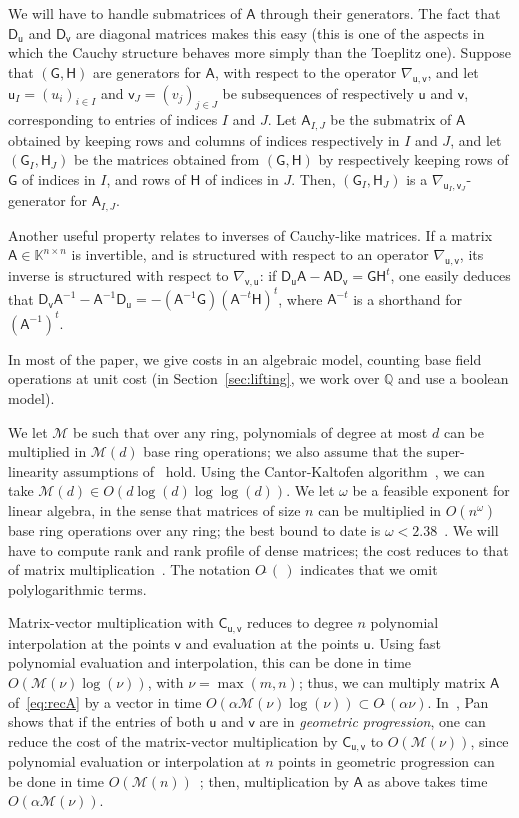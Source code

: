 \documentclass[sigconf]{acmart}
\newcommand{\vu}{\ensuremath{\mathsf{u}}}
\newcommand{\vv}{\ensuremath{\mathsf{v}}}
\newcommand{\mA}{\ensuremath{\mathsf{A}}}
\newcommand{\mC}{\ensuremath{\mathsf{C}}}
\newcommand{\mD}{\ensuremath{\mathsf{D}}}
\newcommand{\mG}{\ensuremath{\mathsf{G}}}
\newcommand{\mH}{\ensuremath{\mathsf{H}}}
\newcommand{\K}{\ensuremath{\mathbb{K}}}
\newcommand{\Q}{\ensuremath{\mathbb{Q}}}
\newcommand{\M}{\ensuremath{\mathscr{M}}}
\newcommand{\mx}{\ensuremath{\nu}}
\newcommand{\Otilde}[1]{\ensuremath{O\tilde{~}(#1)}} %
\theoremstyle{acmdefinition}
\begin{document}
We will have to handle submatrices of $\mA$ through their
generators. The fact that $\mD_{\vu}$ and $\mD_{\vv}$ are diagonal
matrices makes this easy (this is one of the aspects in which the
Cauchy structure behaves more simply than the Toeplitz one).  Suppose
that $(\mG,\mH)$ are generators for $\mA$, with respect to the
operator $\nabla_{\vu,\vv}$, and let $\vu_I=(u_i)_{i \in I}$ and
$\vv_J=(v_j)_{j \in J}$ be subsequences of respectively $\vu$ and
$\vv$, corresponding to entries of indices $I$ and $J$. Let
$\mA_{I,J}$ be the submatrix of $\mA$ obtained by keeping rows and
columns of indices respectively in $I$ and $J$, and let
$(\mG_I,\mH_J)$ be the matrices obtained from $(\mG,\mH)$ by
respectively keeping rows of $\mG$ of indices in $I$, and rows of
$\mH$ of indices in $J$. Then, $(\mG_I,\mH_J)$ is a
$\nabla_{\vu_I,\vv_J}$-generator for $\mA_{I,J}$.

Another useful property relates to inverses of Cauchy-like matrices.
If a matrix $\mA \in \K^{n\times n}$ is invertible, and is structured
with respect to an operator $\nabla_{\vu,\vv}$, its inverse is
structured with respect to $\nabla_{\vv,\vu}$: if $\mD_\vu \mA - \mA
\mD_\vv = \mG \mH^t$, one easily deduces that $\mD_\vv \mA^{-1} -
\mA^{-1} \mD_\vu = - (\mA^{-1} \mG) (\mA^{-t} \mH)^t$, where $\mA^{-t}$
is a shorthand for $(\mA^{-1})^t$.


\smallskip{}  In most of the paper, we
give costs in an algebraic model, counting base field operations at
unit cost (in Section~\ref{sec:lifting}, we work over $\Q$ and use 
a boolean model).

We let $\M$ be such that over any ring, polynomials of degree at most
$d$ can be multiplied in $\M(d)$ base ring operations; we also assume
that the super-linearity assumptions of~\cite[Chapter~8]{GaGe13}
hold. Using the Cantor-Kaltofen algorithm~\cite{CaKa91}, we can take
$\M(d)\in O(d \log(d)\log\log(d))$. We let $\omega$ be a feasible
exponent for linear algebra, in the sense that matrices of size $n$
can be multiplied in $O(n^\omega)$ base ring operations over any ring;
the best bound to date is $\omega < 2.38$~\cite{CoWi90, LeGall14}.  We
will have to compute rank and rank profile of dense matrices; the cost
reduces to that of matrix multiplication~\cite{IbMoHu82}. The notation
$\Otilde{\,}$ indicates that we omit polylogarithmic terms.

Matrix-vector multiplication with $\mC_{\vu,\vv}$ reduces to degree
$n$ polynomial interpolation at the points $\vv$ and evaluation at the
points $\vu$. Using fast polynomial evaluation and interpolation, this
can be done in time $O(\M(\mx)\log(\mx))$, with $\mx=\max(m,n)$; thus, we
can multiply matrix $\mA$ of~\eqref{eq:recA} by a vector in time
$O(\alpha \M(\mx)\log(\mx))\subset \Otilde{\alpha \mx}$.
In~\cite[Theorem~4.7.3]{Pan01}, Pan shows that if the entries of both
$\vu$ and $\vv$ are in {\em geometric progression}, one can reduce the
cost of the matrix-vector multiplication by $\mC_{\vu,\vv}$ to
$O(\M(\mx))$, since polynomial evaluation or interpolation at $n$
points in geometric progression can be done in time $O(\M(n))$~\cite{Bluestein70,BoSc05};
then, multiplication by $\mA$ as above takes time
$O(\alpha\M(\mx))$.
\end{document}
